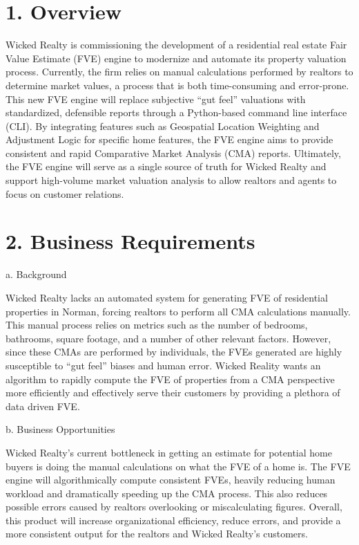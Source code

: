 \documentclass[
]{article}
\begin{document}
\tableofcontents
\newpage
{} {}\section{1. Overview}\label{overview}

Wicked Realty is commissioning the development of a residential real
estate Fair Value Estimate (FVE) engine to modernize and automate its
property valuation process. Currently, the firm relies on manual
calculations performed by realtors to determine market values, a process
that is both time-consuming and error-prone. This new FVE engine will
replace subjective ``gut feel'' valuations with standardized, defensible
reports through a Python-based command line interface (CLI). By
integrating features such as Geospatial Location Weighting and
Adjustment Logic for specific home features, the FVE engine aims to
provide consistent and rapid Comparative Market Analysis (CMA) reports.
Ultimately, the FVE engine will serve as a single source of truth for
Wicked Realty and support high-volume market valuation analysis to allow
realtors and agents to focus on customer relations.

 {}\section{2. Business Requirements}\label{business-requirements}

a. Background

Wicked Realty lacks an automated system for generating FVE of
residential properties in Norman, forcing realtors to perform all CMA
calculations manually. This manual process relies on metrics such as the
number of bedrooms, bathrooms, square footage, and a number of other
relevant factors. However, since these CMAs are performed by
individuals, the FVEs generated are highly susceptible to ``gut feel''
biases and human error. Wicked Reality wants an algorithm to rapidly
compute the FVE of properties from a CMA perspective more efficiently
and effectively serve their customers by providing a plethora of data
driven FVE.

b. Business Opportunities

Wicked Realty's current bottleneck in getting an estimate for potential
home buyers is doing the manual calculations on what the FVE of a home
is. The FVE engine will algorithmically compute consistent FVEs, heavily
reducing human workload and dramatically speeding up the CMA process.
This also reduces possible errors caused by realtors overlooking or
miscalculating figures. Overall, this product will increase
organizational efficiency, reduce errors, and provide a more consistent
output for the realtors and Wicked Realty's customers.
\end{document}

